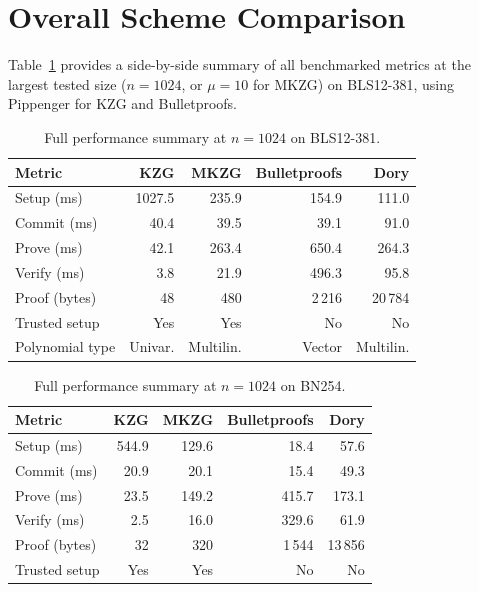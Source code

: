 \section{Overall Scheme Comparison}
\label{sec:overall}

Table~\ref{tab:overall-n1024} provides a side-by-side summary of all
benchmarked metrics at the largest tested size ($n = 1024$, or
$\mu = 10$ for MKZG) on BLS12-381, using Pippenger for KZG and
Bulletproofs.

\begin{table}[H]
\centering
\caption{Full performance summary at $n = 1024$ on BLS12-381.}
\label{tab:overall-n1024}
\begin{tabular}{lrrrr}
\toprule
\textbf{Metric} & \textbf{KZG} & \textbf{MKZG} & \textbf{Bulletproofs} & \textbf{Dory} \\
\midrule
Setup (ms)      & 1027.5 & 235.9  & 154.9   & 111.0  \\
Commit (ms)     & 40.4   & 39.5   & 39.1    & 91.0   \\
Prove (ms)      & 42.1   & 263.4  & 650.4   & 264.3  \\
Verify (ms)     & 3.8    & 21.9   & 496.3   & 95.8   \\
Proof (bytes)   & 48     & 480    & 2\,216  & 20\,784 \\
Trusted setup   & Yes    & Yes    & No      & No     \\
Polynomial type & Univar.& Multilin.& Vector & Multilin. \\
\bottomrule
\end{tabular}
\end{table}

\begin{table}[H]
\centering
\caption{Full performance summary at $n = 1024$ on BN254.}
\label{tab:overall-n1024-bn254}
\begin{tabular}{lrrrr}
\toprule
\textbf{Metric} & \textbf{KZG} & \textbf{MKZG} & \textbf{Bulletproofs} & \textbf{Dory} \\
\midrule
Setup (ms)      & 544.9  & 129.6  & 18.4    & 57.6   \\
Commit (ms)     & 20.9   & 20.1   & 15.4    & 49.3   \\
Prove (ms)      & 23.5   & 149.2  & 415.7   & 173.1  \\
Verify (ms)     & 2.5    & 16.0   & 329.6   & 61.9   \\
Proof (bytes)   & 32     & 320    & 1\,544  & 13\,856 \\
Trusted setup   & Yes    & Yes    & No      & No     \\
\bottomrule
\end{tabular}
\end{table}

